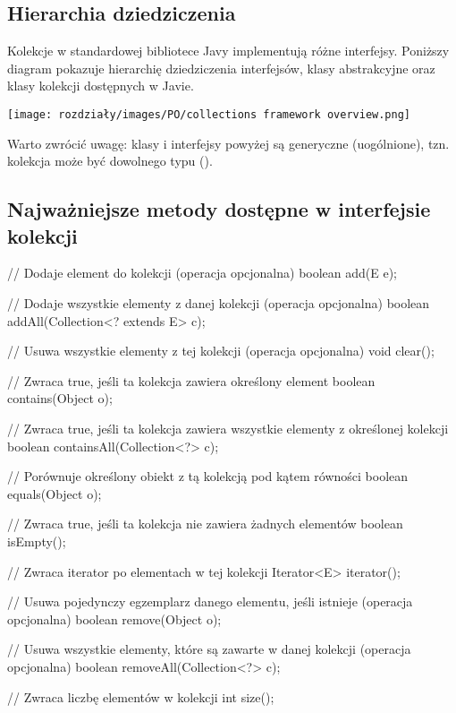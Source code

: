\subsection{Hierarchia dziedziczenia}
Kolekcje w standardowej bibliotece Javy implementują różne interfejsy. Poniższy diagram pokazuje hierarchię dziedziczenia interfejsów, klasy abstrakcyjne oraz klasy kolekcji dostępnych w Javie.

\texttt{[image: rozdziały/images/PO/collections framework overview.png]}

Warto zwrócić uwagę: klasy i interfejsy powyżej są generyczne (uogólnione), tzn. kolekcja może być dowolnego typu ().

\subsection{Najważniejsze metody dostępne w interfejsie kolekcji}

\begin{java}
    // Dodaje element do kolekcji (operacja opcjonalna)
    boolean add(E e); 
    
    // Dodaje wszystkie elementy z danej kolekcji (operacja opcjonalna)
    boolean addAll(Collection<? extends E> c);  

    // Usuwa wszystkie elementy z tej kolekcji (operacja opcjonalna)
    void clear(); 
    
    // Zwraca true, jeśli ta kolekcja zawiera określony element
    boolean contains(Object o); 

    // Zwraca true, jeśli ta kolekcja zawiera wszystkie elementy z określonej kolekcji
    boolean containsAll(Collection<?> c); 

    // Porównuje określony obiekt z tą kolekcją pod kątem równości
    boolean equals(Object o); 

    // Zwraca true, jeśli ta kolekcja nie zawiera żadnych elementów
    boolean isEmpty(); 

    // Zwraca iterator po elementach w tej kolekcji
    Iterator<E> iterator(); 

    // Usuwa pojedynczy egzemplarz danego elementu, jeśli istnieje (operacja opcjonalna)
    boolean remove(Object o); 

    // Usuwa wszystkie elementy, które są zawarte w danej kolekcji (operacja opcjonalna)
    boolean removeAll(Collection<?> c); 

    // Zwraca liczbę elementów w kolekcji
    int size(); 
\end{java}

